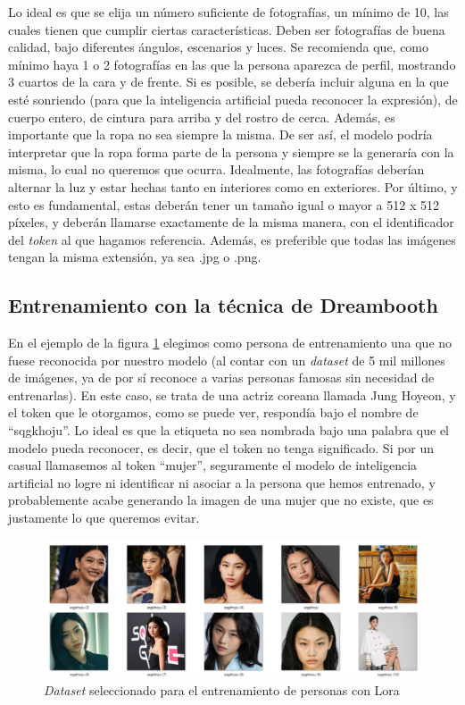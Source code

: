 Lo ideal es que se elija un número suficiente de fotografías, un mínimo de 10, las cuales tienen que cumplir ciertas características. Deben ser fotografías de buena calidad, bajo diferentes ángulos, escenarios y luces. Se recomienda que, como mínimo haya 1 o 2 fotografías en las que la persona aparezca de perfil, mostrando 3 cuartos de la cara y de frente. Si es posible, se debería incluir alguna en la que esté sonriendo (para que la inteligencia artificial pueda reconocer la expresión), de cuerpo entero, de cintura para arriba y del rostro de cerca. Además, es importante que la ropa no sea siempre la misma. De ser así, el modelo podría interpretar que la ropa forma parte de la persona y siempre se la generaría con la misma, lo cual no queremos que ocurra. Idealmente, las fotografías deberían alternar la luz y estar hechas tanto en interiores como en exteriores. Por último, y esto es fundamental, estas deberán tener un tamaño igual o mayor a 512 x 512 píxeles, y deberán llamarse exactamente de la misma manera, con el identificador del \textit{token} al que hagamos referencia. Además, es preferible que todas las imágenes tengan la misma extensión, ya sea .jpg o .png. 

\subsection{Entrenamiento con la técnica de Dreambooth}

En el ejemplo de la figura \ref{fig:datasethoyeon}  elegimos como persona de entrenamiento una que no fuese reconocida por nuestro modelo (al contar con un \textit{dataset} de 5 mil millones de imágenes, ya de por sí reconoce a varias personas famosas sin necesidad de entrenarlas). En este caso, se trata de una actriz coreana llamada Jung Hoyeon, y el token que le otorgamos, como se puede ver, respondía bajo el nombre de ``sqgkhoju''. Lo ideal es que la etiqueta no sea nombrada bajo una palabra que el modelo pueda reconocer, es decir, que el token no tenga significado. Si por un casual llamasemos al token ``mujer'', seguramente el modelo de inteligencia artificial no logre ni identificar ni asociar a la persona que hemos entrenado, y probablemente acabe generando la imagen de una mujer que no existe, que es justamente lo que queremos evitar. \\

\begin{figure}[h]
	\centering
	\includegraphics[width = 1
	\textwidth]{Imagenes/Vectorial/datasethoyeon.png}
	\caption{\textit{Dataset} seleccionado para el entrenamiento de personas con Lora}
	\label{fig:datasethoyeon}
\end{figure}

